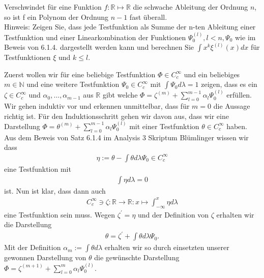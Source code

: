 \begin{exercise}

Verschwindet für eine Funktion $f: \mathbb{R} \mapsto \mathbb{R}$ die schwache Ableitung der Ordnung $n$, so ist f ein Polynom der Ordnung $n-1$ fast überall.\\

Hinweis: Zeigen Sie, dass jede Testfunktion als Summe der n-ten Ableitung einer Testfunktion und einer Linearkombination der Funktionen $\Psi_0^{(l)}, l < n, \Psi_0$ wie
im Beweis von 6.1.4. dargestellt werden kann und berechnen Sie $\int x^k\xi^{(l)}(x)dx$ für Testfunktionen $\xi$ und $k \leq l$.

\end{exercise}

\begin{solution}
    Zuerst wollen wir für eine beliebige Testfunktion $\Phi\in C_c^\infty$  und ein beliebiges $m\in\mathbb{N}$ und eine weitere Testfunktion $\Psi_0\in C_c^\infty$ mit $\int \Psi_0d\lambda=1$ zeigen, dass es ein $\zeta\in C_c^\infty$ und $\alpha_0,\dots,\alpha_{m-1}$ aus $\mathbb{R}$ gibt welche $\Phi=\zeta^{(m)}+\sum_{l=0}^{m-1}\alpha_l\Psi_0^{(l)}$ erfüllen. Wir gehen induktiv vor und erkennen unmittelbar, dass für $m=0$ die Aussage richtig ist. Für den Induktionsschritt gehen wir davon aus, dass wir eine Darstellung $\Phi=\theta^{(m)}+\sum_{l=0}^{m-1}\alpha_l\Psi_0^{(l)}$ mit einer Testfunktion $\theta\in C_c^\infty$ haben. Aus dem Beweis von Satz 6.1.4 im Analysis 3 Skriptum Blümlinger wissen wir dass
    \begin{align*}
        \eta:=\theta-\int\theta d\lambda\Psi_0\in C_c^\infty
    \end{align*} 
    eine Testfunktion mit
    \begin{align*}
        \int\eta d\lambda=0
    \end{align*} 
    ist. Nun ist klar, dass dann auch
    \begin{align*}
        C_c^\infty\ni\zeta:\mathbb{R}\to\mathbb{R}:x\mapsto\int_{-\infty}^x\eta d\lambda
    \end{align*}
    eine Testfunktion sein muss. Wegen $\zeta^{\prime}=\eta$ und der Definition von $\zeta$ erhalten wir die Darstellung 
    \begin{align*}
        \theta=\zeta^{\prime}+\int\theta d\lambda\Psi_0.
    \end{align*}
    Mit der Definition $\alpha_m:=\int\theta d\lambda$ erhalten wir so durch einsetzten unserer gewonnen Darstellung von $\theta$ die gewünschte Darstellung $\Phi=\zeta^{(m+1)}+\sum_{l=0}^{m}\alpha_l\Psi_0^{(l)}$.


\end{solution}
